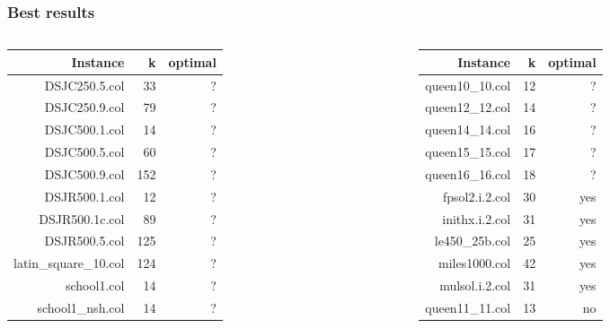 \documentclass{beamer}
\begin{document}
\begin{frame}
    \frametitle{Best results}


  \begin{columns}
    \begin{column}{0.48\textwidth}
       \begin{table}
   \begin{tabular}{r | r | r |}
       
       Instance & k & optimal \\
       \hline 
       DSJC250.5.col & 33 & ? \\
       DSJC250.9.col & 79 & ? \\
       DSJC500.1.col & 14 & ? \\
       DSJC500.5.col & 60 & ? \\
       DSJC500.9.col & 152 & ? \\
       DSJR500.1.col & 12 & ? \\
       DSJR500.1c.col & 89 & ? \\
       DSJR500.5.col & 125 & ? \\
       latin\_square\_10.col & 124 & ? \\
       school1.col & 14 & ? \\
       school1\_nsh.col & 14 & ? \\
       \hline
   \end{tabular}
     \end{table}
    \end{column}
    \begin{column}{0.48\textwidth}
      \begin{table}
   \begin{tabular}{r | r | r }
       
       Instance & k & optimal \\
       \hline 
       queen10\_10.col & 12 & ? \\
       queen12\_12.col & 14 & ? \\
       queen14\_14.col & 16 & ? \\
       queen15\_15.col & 17 & ? \\
       queen16\_16.col & 18 & ? \\
       fpsol2.i.2.col & 30 & yes \\
       inithx.i.2.col & 31 & yes \\
       le450\_25b.col & 25 & yes \\
       miles1000.col & 42 &  yes \\
       mulsol.i.2.col & 31 & yes \\
       queen11\_11.col & 13 & no \\
       \hline
     \end{tabular}
      
     \end{table}

    \end{column}
\end{columns}
   

  \end{frame}
\end{document}
